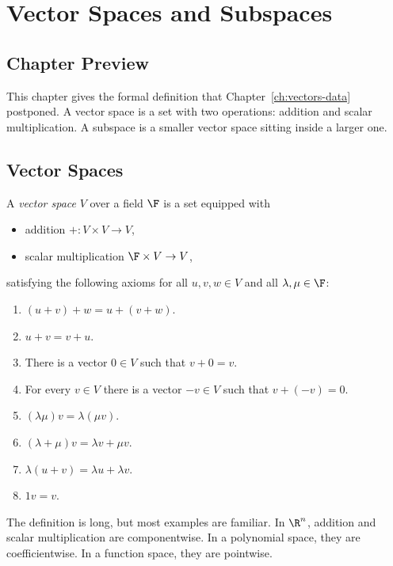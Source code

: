 \chapter{Vector Spaces and Subspaces}
\label{ch:vector-spaces-subspaces}

\section*{Chapter Preview}

This chapter gives the formal definition that Chapter~\ref{ch:vectors-data}
postponed. A vector space is a set with two operations: addition and scalar
multiplication. A subspace is a smaller vector space sitting inside a larger
one.

\section{Vector Spaces}

\begin{definition}
  A \emph{vector space} $V$ over a field $\F$ is a set equipped with
  \begin{itemize}
    \item addition $+:V\times V\to V$,
    \item scalar multiplication $\F\times V\to V$,
  \end{itemize}
  satisfying the following axioms for all $u,v,w\in V$ and all
  $\lambda,\mu\in\F$:
  \begin{enumerate}
    \item $(u+v)+w=u+(v+w)$.
    \item $u+v=v+u$.
    \item There is a vector $0\in V$ such that $v+0=v$.
    \item For every $v\in V$ there is a vector $-v\in V$ such that
      $v+(-v)=0$.
    \item $(\lambda\mu)v=\lambda(\mu v)$.
    \item $(\lambda+\mu)v=\lambda v+\mu v$.
    \item $\lambda(u+v)=\lambda u+\lambda v$.
    \item $1v=v$.
  \end{enumerate}
\end{definition}

The definition is long, but most examples are familiar. In $\R^n$, addition
and scalar multiplication are componentwise. In a polynomial space, they are
coefficientwise. In a function space, they are pointwise.

